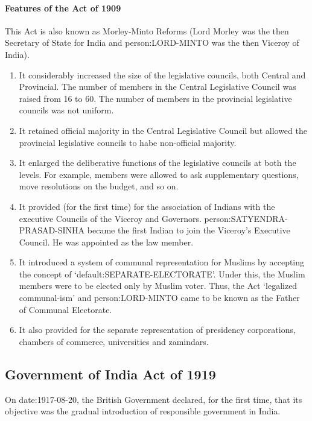 \paragraph{Features of the Act of 1909}
This Act is also known as Morley-Minto Reforms (Lord Morley was the then Secretary of State for India and \gls{person:LORD-MINTO} was the then Viceroy of India).
\begin{enumerate}
  \item It considerably increased the size of the legislative councils, both Central and Provincial. The number of members in the Central Legislative Council was raised from 16 to 60. The number of members in the provincial legislative councils was not uniform.
  \item It retained official majority in the Central Legislative Council but allowed the provincial legislative councils to habe non-official majority.
  \item It enlarged the deliberative functions of the legislative councils at both the levels. For example, members were allowed to ask supplementary questions, move resolutions on the budget, and so on.
  \item It provided (for the first time) for the association of Indians with the executive Councils of the Viceroy and Governors. \gls{person:SATYENDRA-PRASAD-SINHA} became the first Indian to join the Viceroy's Executive Council. He was appointed as the law member.
  \item It introduced a system of communal representation for Muslims by accepting the concept of `\gls{default:SEPARATE-ELECTORATE}'. Under this, the Muslim members were to be elected only by Muslim voter. Thus, the Act `legalized communal-ism' and \gls{person:LORD-MINTO} came to be known as the Father of Communal Electorate.
  \item It also provided for the separate representation of presidency corporations, chambers of commerce, universities and zamindars.
\end{enumerate}

\subsection{Government of India Act of 1919}

On \gls{date:1917-08-20}, the British Government declared, for the first time, that its objective was the gradual introduction of responsible government in India.

